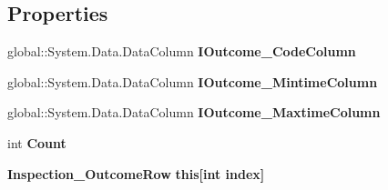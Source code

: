 \subsection*{Properties}
\begin{DoxyCompactItemize}
\item 
\mbox{\label{class_a_f_h___scheduler_1_1_home_inspection_data_set_1_1_inspection___outcome_data_table_a9db808ec6c23374fa9c18e93df3637e2}} 
global\+::\+System.\+Data.\+Data\+Column {\bfseries I\+Outcome\+\_\+\+Code\+Column}\hspace{0.3cm}{\ttfamily  [get]}
\item 
\mbox{\label{class_a_f_h___scheduler_1_1_home_inspection_data_set_1_1_inspection___outcome_data_table_a1edc8bb924bf565915d292635c781d0b}} 
global\+::\+System.\+Data.\+Data\+Column {\bfseries I\+Outcome\+\_\+\+Mintime\+Column}\hspace{0.3cm}{\ttfamily  [get]}
\item 
\mbox{\label{class_a_f_h___scheduler_1_1_home_inspection_data_set_1_1_inspection___outcome_data_table_a3c68fe8faa628e17190f3c0864ece392}} 
global\+::\+System.\+Data.\+Data\+Column {\bfseries I\+Outcome\+\_\+\+Maxtime\+Column}\hspace{0.3cm}{\ttfamily  [get]}
\item 
\mbox{\label{class_a_f_h___scheduler_1_1_home_inspection_data_set_1_1_inspection___outcome_data_table_a89aba7bfce4fce8c2f8689f1b306e533}} 
int {\bfseries Count}\hspace{0.3cm}{\ttfamily  [get]}
\item 
\mbox{\label{class_a_f_h___scheduler_1_1_home_inspection_data_set_1_1_inspection___outcome_data_table_ab8aaed3e737fff0e1208e965b32cca3e}} 
\textbf{ Inspection\+\_\+\+Outcome\+Row} {\bfseries this[int index]}\hspace{0.3cm}{\ttfamily  [get]}
\end{DoxyCompactItemize}
